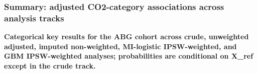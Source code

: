 \documentclass[
  11pt,
  letterpaper,
  DIV=11,
  numbers=noendperiod]{scrartcl}
\begin{document}
\subsubsection{Summary: adjusted CO2-category associations across
analysis
tracks}\label{summary-adjusted-co2-category-associations-across-analysis-tracks}

\begin{landscape}

\begin{center}\textbf{Categorical key results for the ABG cohort across crude, unweighted adjusted, imputed non-weighted, MI-logistic IPSW-weighted, and GBM IPSW-weighted analyses; probabilities are conditional on X\_ref except in the crude track.}\end{center}

\begin{table}[!h]
\centering\begingroup\fontsize{6}{8}\selectfont


\end{table}
\end{landscape}
\end{document}
